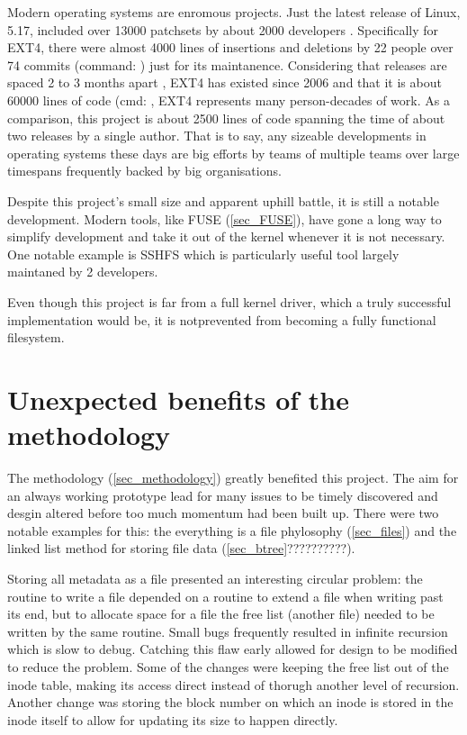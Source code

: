         Modern operating systems are enromous projects. Just the latest release
        of Linux, 5.17, included over 13000 patchsets by about 2000 developers
        \cite{Linux_dev_count}.  Specifically for EXT4, there were almost 4000
        lines of insertions and deletions by 22 people over 74 commits
        (command: ) just for
        its maintanence. Considering that releases are spaced 2 to 3 months
        apart \cite{Linux_dev_process}, EXT4 has existed since 2006
        \cite{ext4_origin} and that it is about 60000 lines of code (cmd:
        , EXT4 represents many person-decades of work.
        As a comparison, this project is about 2500 lines of code spanning the
        time of about two releases by a single author. That is to say, any
        sizeable developments in operating systems these days are big efforts
        by teams of multiple teams over large timespans frequently backed by
        big organisations.

        Despite this project's small size and apparent uphill battle, it is
        still a notable development. Modern tools, like FUSE (\ref{sec_FUSE}),
        have gone a long way to simplify development and take it out of the
        kernel whenever it is not necessary. One notable example is SSHFS
        \cite{SSHFS} which is particularly useful
        tool largely maintaned by 2 developers.

        Even though this project is far from a full kernel driver, which a
        truly successful implementation would be, it is notprevented from
        becoming a fully functional filesystem.

    \section{Unexpected benefits of the methodology}

        The methodology (\ref{sec_methodology}) greatly benefited this project.
        The aim for an always working prototype lead for many issues to be
        timely discovered and desgin altered before too much momentum had been
        built up. There were two notable examples for this: the everything is a
        file phylosophy (\ref{sec_files}) and the linked list method for
        storing file data (\ref{sec_btree}??????????).

        Storing all metadata as a file presented an interesting circular
        problem: the routine to write a file depended on a routine to extend a
        file when writing past its end, but to allocate space for a file the
        free list (another file) needed to be written by the same routine.
        Small bugs frequently resulted in infinite recursion which is slow to
        debug. Catching this flaw early allowed for design to be modified to
        reduce the problem.  Some of the changes were keeping the free list out
        of the inode table, making its access direct instead of thorugh another
        level of recursion.  Another change was storing the block number on
        which an inode is stored in the inode itself to allow for updating its
        size to happen directly.

